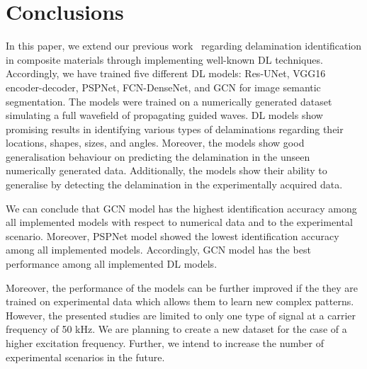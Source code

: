 \section{Conclusions}
\label{conclusion}
In this paper, we extend our previous work~\cite{Ijjeh2021} regarding delamination identification in composite materials through implementing well-known DL techniques. 
Accordingly, we have trained five different DL models: Res-UNet, VGG16 encoder-decoder, PSPNet, FCN-DenseNet, and GCN for image semantic segmentation.
The models were trained on a numerically generated dataset simulating a full wavefield of propagating guided waves.
DL models show promising results in identifying various types of delaminations regarding their locations, shapes, sizes, and angles. 
Moreover, the models show good generalisation behaviour on predicting the delamination in the unseen numerically generated data.
Additionally, the models show their ability to generalise by detecting the delamination in the experimentally acquired data.

We can conclude that GCN model has the highest identification accuracy among all implemented models with respect to numerical data and to the experimental scenario.
Moreover, PSPNet model showed the lowest identification accuracy among all implemented models.
Accordingly, GCN model has the best performance among all implemented DL models.
 
Moreover, the performance of the models can be further improved if the they are trained on experimental data which allows them to learn new complex patterns.
However, the presented studies are limited to only one type of signal at a carrier frequency of 50 kHz. 
We are planning to create a new dataset for the case of a higher excitation frequency. 
Further, we intend to increase the number of experimental scenarios in the future.